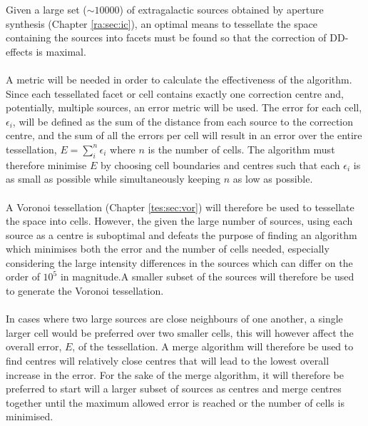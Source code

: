 Given a large set ($\sim10000$) of extragalactic sources obtained by aperture synthesis (Chapter \ref{ra:sec:ic}), an optimal means to tessellate the space containing the sources into facets must be found so that the correction of DD-effects is maximal.
\\
\\
A metric will be needed in order to calculate the effectiveness of the algorithm. Since each tessellated facet or cell contains exactly one correction centre and, potentially, multiple sources, an error metric will be used. The error for each cell, $\epsilon_i$, will be defined as the sum of the distance from each source to the correction centre, and the sum of all the errors per cell will result in an error over the entire tessellation, $E = \sum^n_i \epsilon_i$ where $n$ is the number of cells. The algorithm must therefore minimise $E$ by choosing cell boundaries and centres such that each $\epsilon_i$ is as small as possible while simultaneously keeping $n$ as low as possible.
\\
\\
A Voronoi tessellation (Chapter \ref{tes:sec:vor}) will therefore be used to tessellate the space into cells. However, the given the large number of sources, using each source as a centre is suboptimal and defeats the purpose of finding an algorithm which minimises both the error and the number of cells needed, especially considering the large intensity differences in the sources which can differ on the order of $10^5$ in magnitude.A smaller subset of the sources will therefore be used to generate the Voronoi tessellation.
\\
\\
In cases where two large sources are close neighbours of one another, a single larger cell would be preferred over two smaller cells, this will however affect the overall error, $E$, of the tessellation. A merge algorithm will therefore be used to find centres will relatively close centres that will lead to the lowest overall increase in the error. For the sake of the merge algorithm, it will therefore be preferred to start will a larger subset of sources as centres and merge centres together until the maximum allowed error is reached or the number of cells is minimised.